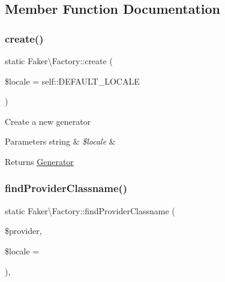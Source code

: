 \subsection{Member Function Documentation}
\mbox{\label{classFaker_1_1Factory_a98e6f274219744ee33c7434c1d2668ad}} 
\subsubsection{\texorpdfstring{create()}{create()}}
{\footnotesize\ttfamily static Faker\textbackslash{}\+Factory\+::create (\begin{DoxyParamCaption}\item[{}]{\$locale = {\ttfamily self\+:\+:DEFAULT\+\_\+LOCALE} }\end{DoxyParamCaption})\hspace{0.3cm}{\ttfamily [static]}}

Create a new generator


\begin{DoxyParams}[1]{Parameters}
string & {\em \$locale} & \\
\hline
\end{DoxyParams}
\begin{DoxyReturn}{Returns}
\hyperlink{classFaker_1_1Generator}{Generator} 
\end{DoxyReturn}
\mbox{\label{classFaker_1_1Factory_a775386565ba237a11fccd08f29fecfb7}} 
\subsubsection{\texorpdfstring{find\+Provider\+Classname()}{findProviderClassname()}}
{\footnotesize\ttfamily static Faker\textbackslash{}\+Factory\+::find\+Provider\+Classname (\begin{DoxyParamCaption}\item[{}]{\$provider,  }\item[{}]{\$locale = {\ttfamily \textquotesingle{}\textquotesingle{}} }\end{DoxyParamCaption})\hspace{0.3cm}{\ttfamily [static]}, {\ttfamily [protected]}}


